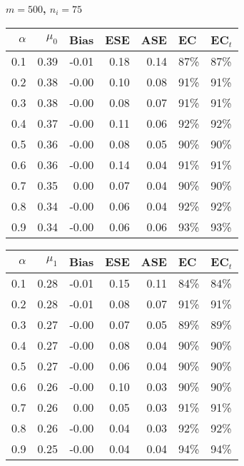 \documentclass[12pt, letterpaper]{article}
\begin{document}
\clearpage



\begin{center}
	\textbf{$m=500$, $n_i=75$} 
\end{center}
\begin{table}[ht!]
	\centering
	\bgroup
	\def\arraystretch{1.25}
	\setlength\tabcolsep{0.05in}
	\begin{tabular}{rrrrrll}
		\hline
		$\alpha$ & $\mu_0$ & Bias & ESE & ASE & EC & EC$_t$ \\ 
		\hline
		0.1 & 0.39 & -0.01 & 0.18 & 0.14 & 87\% & 87\% \\ 
  0.2 & 0.38 & -0.00 & 0.10 & 0.08 & 91\% & 91\% \\ 
  0.3 & 0.38 & -0.00 & 0.08 & 0.07 & 91\% & 91\% \\ 
  0.4 & 0.37 & -0.00 & 0.11 & 0.06 & 92\% & 92\% \\ 
  0.5 & 0.36 & -0.00 & 0.08 & 0.05 & 90\% & 90\% \\ 
  0.6 & 0.36 & -0.00 & 0.14 & 0.04 & 91\% & 91\% \\ 
  0.7 & 0.35 & 0.00 & 0.07 & 0.04 & 90\% & 90\% \\ 
  0.8 & 0.34 & -0.00 & 0.06 & 0.04 & 92\% & 92\% \\ 
  0.9 & 0.34 & -0.00 & 0.06 & 0.06 & 93\% & 93\% \\ 
		\hline
	\end{tabular}
	\egroup
	\quad 
	\bgroup
	\setlength\tabcolsep{0.05in}
	\def\arraystretch{1.25}
	\begin{tabular}{rrrrrll}
		\hline
		$\alpha$ & $\mu_1$ & Bias & ESE & ASE & EC & EC$_t$ \\
		\hline
		0.1 & 0.28 & -0.01 & 0.15 & 0.11 & 84\% & 84\% \\ 
  0.2 & 0.28 & -0.01 & 0.08 & 0.07 & 91\% & 91\% \\ 
  0.3 & 0.27 & -0.00 & 0.07 & 0.05 & 89\% & 89\% \\ 
  0.4 & 0.27 & -0.00 & 0.08 & 0.04 & 90\% & 90\% \\ 
  0.5 & 0.27 & -0.00 & 0.06 & 0.04 & 90\% & 90\% \\ 
  0.6 & 0.26 & -0.00 & 0.10 & 0.03 & 90\% & 90\% \\ 
  0.7 & 0.26 & 0.00 & 0.05 & 0.03 & 91\% & 91\% \\ 
  0.8 & 0.26 & -0.00 & 0.04 & 0.03 & 92\% & 92\% \\ 
  0.9 & 0.25 & -0.00 & 0.04 & 0.04 & 94\% & 94\% \\ 
		\hline
	\end{tabular}

\end{table}
\end{document}
